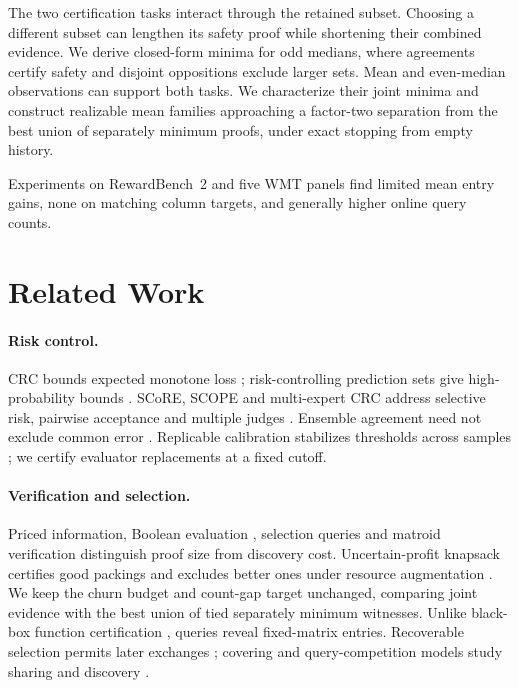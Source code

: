 \documentclass[11pt]{article}
\begin{document}
The two certification tasks interact through the retained subset. Choosing a different subset can lengthen its safety proof while shortening their combined evidence. We derive closed-form minima for odd medians, where agreements certify safety and disjoint oppositions exclude larger sets. Mean and even-median observations can support both tasks. We characterize their joint minima and construct realizable mean families approaching a factor-two separation from the best union of separately minimum proofs, under exact stopping from empty history.

Experiments on RewardBench~2 and five WMT panels find limited mean entry gains, none on matching column targets, and generally higher online query counts.

\section{Related Work}
\label{sec:related}
\paragraph{Risk control.}
CRC bounds expected monotone loss \citep{angelopoulos2024crc,yeh2025conformal}; risk-controlling prediction sets give high-probability bounds \citep{bates2021rcps}. SCoRE, SCOPE and multi-expert CRC address selective risk, pairwise acceptance and multiple judges \citep{bai2026score,badshah2026scope,cheng2026multiexpert}. Ensemble agreement need not exclude common error \citep{afrin2026evaluatorensemblesrewardhacking}. Replicable calibration stabilizes thresholds across samples \citep{papamichalis2026replicableconformalprediction}; we certify evaluator replacements at a fixed cutoff.

\paragraph{Verification and selection.}
Priced information, Boolean evaluation \citep{charikar2002priced,deshpande2016sbfe,gkenosis2018ssclass}, selection queries \citep{chen2026selection,goerigk2015robustqueries} and matroid verification \citep{diwan2026basis} distinguish proof size from discovery cost. Uncertain-profit knapsack certifies good packings and excludes better ones under resource augmentation \citep{schloter2025knapsack}. We keep the churn budget and count-gap target unchanged, comparing joint evidence with the best union of tied separately minimum witnesses. Unlike black-box function certification \citep{blanc2022certification,gupta2022monotone}, queries reveal fixed-matrix entries. Recoverable selection permits later exchanges \citep{chassein2017recoverabletwostagerobustselection}; covering and query-competition models study sharing and discovery \citep{megow2023set,erlebach2015survey,erlebach2021parallel}.
\end{document}
